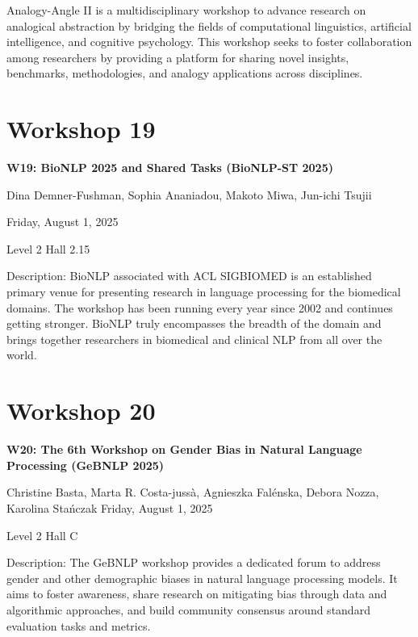 Analogy-Angle II is a multidisciplinary workshop to advance research on analogical abstraction by bridging the fields of computational linguistics, artificial intelligence, and cognitive psychology. This workshop seeks to foster collaboration among researchers by providing a platform for sharing novel insights, benchmarks, methodologies, and analogy applications across disciplines.


\clearpage


\section[W19: BioNLP 2025 and Shared Tasks (BioNLP-ST 2025)]{Workshop 19}

\begin{center}
    {\Large \textbf{W19: BioNLP 2025 and Shared Tasks (BioNLP-ST 2025)}}

 Dina Demner-Fushman, Sophia Ananiadou, Makoto Miwa, Jun-ichi Tsujii

    Friday, August 1, 2025
    
  Level 2 Hall 2.15
\end{center}

Description: BioNLP associated with ACL SIGBIOMED is an established primary venue for presenting research in language processing for the biomedical domains. The workshop has been running every year since 2002 and continues getting stronger. BioNLP truly encompasses the breadth of the domain and brings together researchers in biomedical and clinical NLP from all over the world.

\clearpage


\section[W20: The 6th Workshop on Gender Bias in Natural Language Processing (GeBNLP 2025)]{Workshop 20}

\begin{center}
    {\Large \textbf{W20: The 6th Workshop on Gender Bias in Natural Language Processing (GeBNLP 2025)}}

Christine Basta, Marta R. Costa-jussà, Agnieszka Falénska, Debora Nozza, Karolina Stańczak
    Friday, August 1, 2025
    
 Level 2 Hall C
\end{center}

Description: The GeBNLP workshop provides a dedicated forum to address gender and other demographic biases in natural language processing models. It aims to foster awareness, share research on mitigating bias through data and algorithmic approaches, and build community consensus around standard evaluation tasks and metrics.

